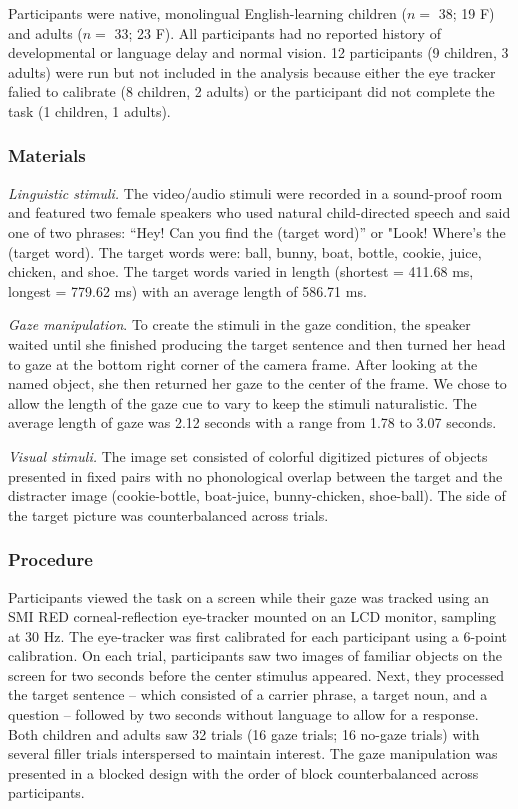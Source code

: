 \documentclass[10pt, letterpaper]{article}
\begin{document}
Participants were native, monolingual English-learning children (\(n=\)
38; 19 F) and adults (\(n=\) 33; 23 F). All participants had no reported
history of developmental or language delay and normal vision. 12
participants (9 children, 3 adults) were run but not included in the
analysis because either the eye tracker falied to calibrate (8 children,
2 adults) or the participant did not complete the task (1 children, 1
adults).

\hypertarget{materials}{%
\subsubsection{Materials}\label{materials}}

\emph{Linguistic stimuli.} The video/audio stimuli were recorded in a
sound-proof room and featured two female speakers who used natural
child-directed speech and said one of two phrases: ``Hey! Can you find
the (target word)'' or "Look! Where's the (target word). The target
words were: ball, bunny, boat, bottle, cookie, juice, chicken, and shoe.
The target words varied in length (shortest = 411.68 ms, longest =
779.62 ms) with an average length of 586.71 ms.

\emph{Gaze manipulation}. To create the stimuli in the gaze condition,
the speaker waited until she finished producing the target sentence and
then turned her head to gaze at the bottom right corner of the camera
frame. After looking at the named object, she then returned her gaze to
the center of the frame. We chose to allow the length of the gaze cue to
vary to keep the stimuli naturalistic. The average length of gaze was
2.12 seconds with a range from 1.78 to 3.07 seconds.

\emph{Visual stimuli.} The image set consisted of colorful digitized
pictures of objects presented in fixed pairs with no phonological
overlap between the target and the distracter image (cookie-bottle,
boat-juice, bunny-chicken, shoe-ball). The side of the target picture
was counterbalanced across trials.

\hypertarget{procedure}{%
\subsubsection{Procedure}\label{procedure}}

Participants viewed the task on a screen while their gaze was tracked
using an SMI RED corneal-reflection eye-tracker mounted on an LCD
monitor, sampling at 30 Hz. The eye-tracker was first calibrated for
each participant using a 6-point calibration. On each trial,
participants saw two images of familiar objects on the screen for two
seconds before the center stimulus appeared. Next, they processed the
target sentence -- which consisted of a carrier phrase, a target noun,
and a question -- followed by two seconds without language to allow for
a response. Both children and adults saw 32 trials (16 gaze trials; 16
no-gaze trials) with several filler trials interspersed to maintain
interest. The gaze manipulation was presented in a blocked design with
the order of block counterbalanced across participants.
\end{document}
